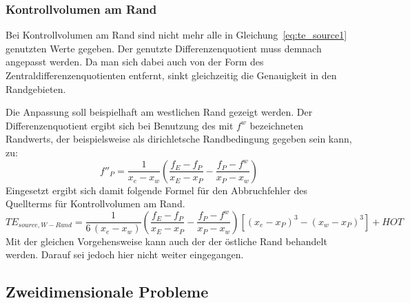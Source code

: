 \subsubsection{Kontrollvolumen am Rand}

Bei Kontrollvolumen am Rand sind nicht mehr alle in Gleichung~\eqref{eq:te_source1}
genutzten Werte gegeben. Der genutzte Differenzenquotient muss demnach angepasst werden.
Da man sich dabei auch von der Form des Zentraldifferenzenquotienten entfernt,
sinkt gleichzeitig die Genauigkeit in den Randgebieten.

Die Anpassung soll beispielhaft am westlichen Rand gezeigt werden. Der Differenzenquotient
ergibt sich bei Benutzung des mit $f^w$ bezeichneten Randwerts, der beispielsweise als
dirichletsche Randbedingung gegeben sein kann, zu:
\begin{equation}
  f''_P = \frac{1}{x_e-x_w}\left(\frac{f_E-f_P}{x_E-x_P}-\frac{f_P-f^w}{x_P-x_w}\right)
\end{equation}
Eingesetzt ergibt sich damit folgende Formel für den Abbruchfehler des Quellterms
für Kontrollvolumen am Rand.
\begin{equation}
  TE_{source, W-Rand} =
\frac{1}{6\,(x_e-x_w)}\left(\frac{f_E-f_P}{x_E-x_P}-\frac{f_P-f^w}{x_P-x_w}\right)
  \left[{{(x_e-x_P)}^3-{(x_w-x_P)}^3}\right] + HOT
\end{equation}
Mit der gleichen Vorgehensweise kann auch der der östliche Rand behandelt werden. Darauf
sei jedoch hier nicht weiter eingegangen.



\subsection{Zweidimensionale Probleme}


